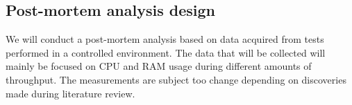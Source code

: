 \documentclass[10pt,a4paper]{proposal}
\begin{document}
	\subsection{Post-mortem analysis design}
		We will conduct a post-mortem analysis based on data acquired from tests performed in a controlled environment. 
		The data that will be collected will mainly be focused on CPU and RAM usage during different amounts of throughput. 
		The measurements are subject too change depending on discoveries made during literature review.

\footnotesize


 
 
\end{document}
